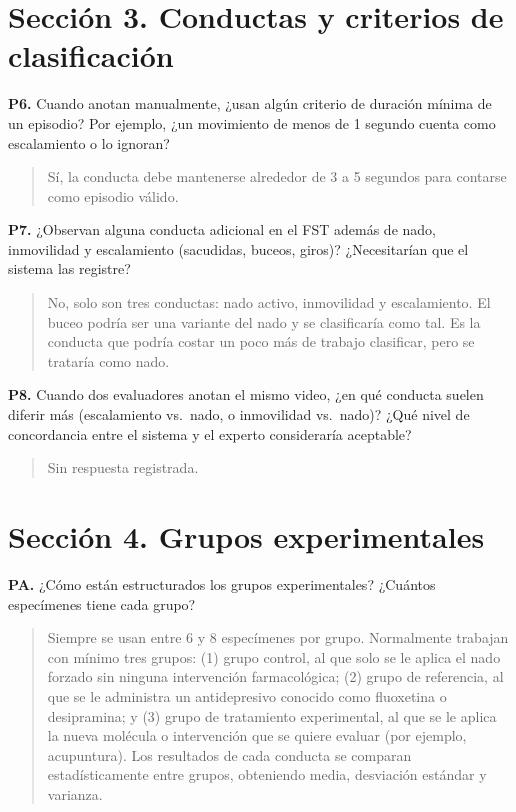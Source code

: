 \section*{Sección 3. Conductas y criterios de clasificación}

\textbf{P6.} Cuando anotan manualmente, ¿usan algún criterio de duración mínima de
un episodio? Por ejemplo, ¿un movimiento de menos de 1 segundo cuenta como
escalamiento o lo ignoran?

\begin{quote}
Sí, la conducta debe mantenerse alrededor de 3 a 5 segundos para contarse como
episodio válido.
\end{quote}

\textbf{P7.} ¿Observan alguna conducta adicional en el FST además de nado,
inmovilidad y escalamiento (sacudidas, buceos, giros)? ¿Necesitarían que el sistema
las registre?

\begin{quote}
No, solo son tres conductas: nado activo, inmovilidad y escalamiento. El buceo podría
ser una variante del nado y se clasificaría como tal. Es la conducta que podría costar
un poco más de trabajo clasificar, pero se trataría como nado.
\end{quote}

\textbf{P8.} Cuando dos evaluadores anotan el mismo video, ¿en qué conducta suelen
diferir más (escalamiento vs.\ nado, o inmovilidad vs.\ nado)? ¿Qué nivel de
concordancia entre el sistema y el experto consideraría aceptable?

\begin{quote}
Sin respuesta registrada.
\end{quote}

\section*{Sección 4. Grupos experimentales}

\textbf{PA.} ¿Cómo están estructurados los grupos experimentales? ¿Cuántos
especímenes tiene cada grupo?

\begin{quote}
Siempre se usan entre 6 y 8 especímenes por grupo. Normalmente trabajan con mínimo
tres grupos: (1) grupo control, al que solo se le aplica el nado forzado sin ninguna
intervención farmacológica; (2) grupo de referencia, al que se le administra un
antidepresivo conocido como fluoxetina o desipramina; y (3) grupo de tratamiento
experimental, al que se le aplica la nueva molécula o intervención que se quiere
evaluar (por ejemplo, acupuntura). Los resultados de cada conducta se comparan
estadísticamente entre grupos, obteniendo media, desviación estándar y varianza.
\end{quote}

